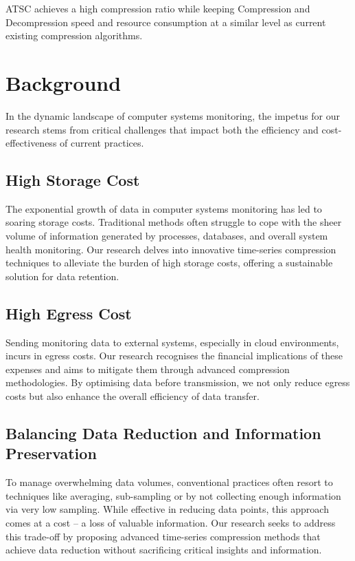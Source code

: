 \documentclass[conference]{IEEEtran}
\begin{document}
ATSC achieves a high compression ratio while keeping Compression and Decompression speed and resource consumption at a similar level as current existing compression algorithms.

\section{Background}

In the dynamic landscape of computer systems monitoring, the impetus for our research stems from critical challenges that impact both the efficiency and cost-effectiveness of current practices. 

\subsection{High Storage Cost}

The exponential growth of data in computer systems monitoring has led to soaring storage costs. Traditional methods often struggle to cope with the sheer volume of information generated by processes, databases, and overall system health monitoring. Our research delves into innovative time-series compression techniques to alleviate the burden of high storage costs, offering a sustainable solution for data retention. 

\subsection{High Egress Cost}
Sending monitoring data to external systems, especially in cloud environments, incurs in egress costs. Our research recognises the financial implications of these expenses and aims to mitigate them through advanced compression methodologies. By optimising data before transmission, we not only reduce egress costs but also enhance the overall efficiency of data transfer. 

\subsection{Balancing Data Reduction and Information Preservation}
To manage overwhelming data volumes, conventional practices often resort to techniques like averaging, sub-sampling or by not collecting enough information via very low sampling. While effective in reducing data points, this approach comes at a cost – a loss of valuable information. Our research seeks to address this trade-off by proposing advanced time-series compression methods that achieve data reduction without sacrificing critical insights and information. 
\end{document}
